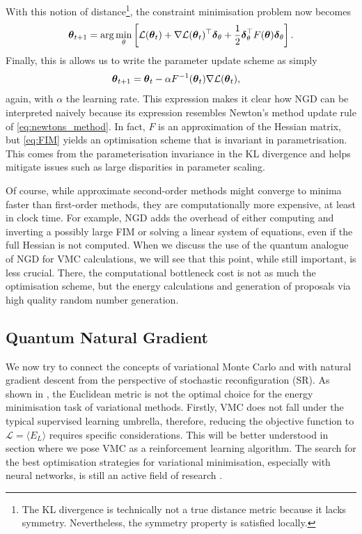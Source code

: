 With this notion of distance\footnote{The KL divergence is technically not a true distance metric because it lacks symmetry. Nevertheless, the symmetry property is satisfied locally.}, the constraint minimisation problem now becomes 
\begin{equation}
\boldsymbol{\theta}_{t+1} = \arg\min_\theta \left[\mathcal{L}(\boldsymbol{\theta}_t) + \nabla \mathcal{L}(\boldsymbol{\theta}_t)^\top \boldsymbol{\delta}_\theta + \frac{1}{2}\boldsymbol{\delta}_\theta^\top F(\boldsymbol{\theta}) \boldsymbol{\delta}_\theta \right].
\label{eq:kl-div}
\end{equation}
Finally, this is allows us to write the parameter update scheme as simply 
\begin{align}
\boldsymbol{\theta}_{t+1} &= \boldsymbol{\theta}_t - \alpha F^{-1}(\boldsymbol{\theta}_t) \nabla \mathcal{L}(\boldsymbol{\theta}_t),
\label{eq:natural_gradient_rule2}
\end{align}
again, with $\alpha$ the learning rate. This expression makes it clear how NGD can be interpreted naively because its expression resembles Newton's method update rule of \eqref{eq:newtons_method}. In fact, $F$ is an approximation of the Hessian matrix, but \eqref{eq:FIM} yields an optimisation scheme that is invariant in parametrisation. This comes from the parameterisation invariance in the KL divergence and helps mitigate issues such as large disparities in parameter scaling.

Of course, while approximate second-order methods might converge to minima faster than first-order methods, they are computationally more expensive, at least in clock time. For example, NGD adds the overhead of either computing and inverting a possibly large FIM or solving a linear system of equations, even if the full Hessian is not computed. When we discuss the use of the quantum analogue of NGD for VMC calculations, we will see that this point, while still important, is less crucial. There, the computational bottleneck cost is not as much the optimisation scheme, but the energy calculations and generation of proposals via high quality random number generation.

\subsection{Quantum Natural Gradient}\label{sec:SR}

We now try to connect the concepts of variational Monte Carlo and with natural gradient descent from the perspective of stochastic reconfiguration (SR). As shown in \cite{harrow2021low}, the Euclidean metric is not the optimal choice for the energy minimisation task of variational methods. Firstly, VMC does not fall under the typical supervised learning umbrella, therefore, reducing the objective function to $\mathcal{L} = \langle E_L\rangle$ requires specific considerations. This will be better understood in section  where we pose VMC as a reinforcement learning algorithm. The search for the best optimisation strategies for variational minimisation, especially with neural networks, is still an active field of research \cite{drissi2024second}.

